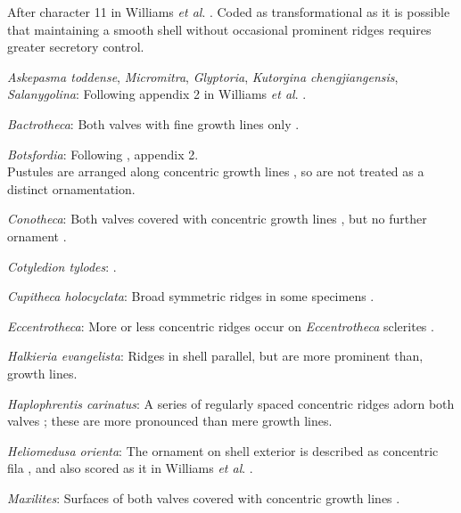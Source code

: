 \documentclass[openany]{book}
\begin{document}
After character 11 in Williams \emph{et al}.
\citeyearpar{Williams1998Thediversity}. Coded as transformational as it
is possible that maintaining a smooth shell without occasional prominent
ridges requires greater secretory control.

\hypertarget{Askepasma_toddense-coding-124}{}
\emph{Askepasma toddense}, \emph{Micromitra}, \emph{Glyptoria},
\emph{Kutorgina chengjiangensis}, \emph{Salanygolina}: Following
appendix 2 in Williams \emph{et al}.
\citeyearpar{Williams1998Thediversity}.

\hypertarget{Bactrotheca-coding-124}{}
\emph{Bactrotheca}: Both valves with fine growth lines only
\citep{Valent2012}.

\hypertarget{Botsfordia-coding-124}{}
\emph{Botsfordia}: Following \citet{Williams1998Thediversity}, appendix
2.\\
Pustules are arranged along concentric growth lines
\citep{Skovsted2005EarlyCambrian}, so are not treated as a distinct
ornamentation.

\hypertarget{Conotheca-coding-124}{}
\emph{Conotheca}: Both valves covered with concentric growth lines
\citep{Devaere2014}, but no further ornament \citep{Wrona2003}.

\hypertarget{Cotyledion_tylodes-coding-124}{}
\emph{Cotyledion tylodes}: \citet{Zhang2013}.

\hypertarget{Cupitheca_holocyclata-coding-124}{}
\emph{Cupitheca holocyclata}: Broad symmetric ridges in some specimens
\citep{Vendrasco2017}.

\hypertarget{Eccentrotheca-coding-124}{}
\emph{Eccentrotheca}: More or less concentric ridges occur on
\emph{Eccentrotheca} sclerites
\citep{Skovsted2011Scleritomeconstruction}.

\hypertarget{Halkieria_evangelista-coding-124}{}
\emph{Halkieria evangelista}: Ridges in shell parallel, but are more
prominent than, growth lines.

\hypertarget{Haplophrentis_carinatus-coding-124}{}
\emph{Haplophrentis carinatus}: A series of regularly spaced concentric
ridges adorn both valves \citep{Moysiuk2017Hyolithsare}; these are more
pronounced than mere growth lines.

\hypertarget{Heliomedusa_orienta-coding-124}{}
\emph{Heliomedusa orienta}: The ornament on shell exterior is described
as concentric fila \citep[P.43]{Chen2007Reinterpretationof}, and also
scored as it in Williams \emph{et al}.
\citeyearpar[pp.160--163]{Williams2000LinguliformeaCraniiformea}.

\hypertarget{Maxilites-coding-124}{}
\emph{Maxilites}: Surfaces of both valves covered with concentric growth
lines \citep{Marek1972, MartiMus2005}.
\end{document}

